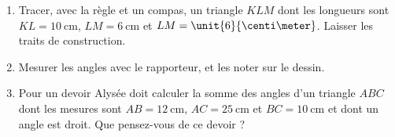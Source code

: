 
\begin{exercice}\label{exosmath-0823}

    \begin{enumerate}
        \item
            Tracer, avec la règle et un compas, un triangle \( KLM\) dont les longueurs sont \( KL=\SI{10}{\centi\meter}\), \( LM=\SI{6}{\centi\meter}\) et \( LM=\unit{6}{\centi\meter}\). Laisser les traits de construction.
        \item
            Mesurer les angles avec le rapporteur, et les noter sur le dessin.
        \item
            Pour un devoir Alysée doit calculer la somme des angles d'un triangle \( ABC\) dont les mesures sont \( AB=\SI{12}{\centi\meter}\), \( AC=\SI{25}{\centi\meter}\) et \( BC=\SI{10}{\centi\meter}\) et dont un angle est droit. Que pensez-vous de ce devoir ?
    \end{enumerate}

\end{exercice}
